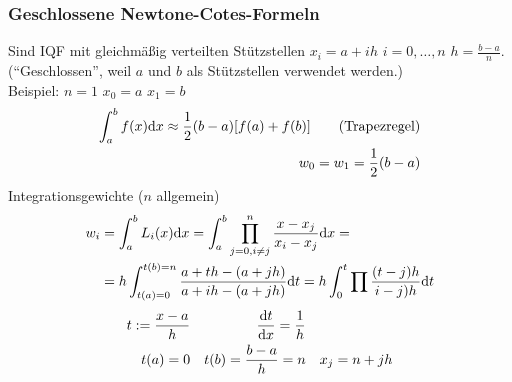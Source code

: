 \subsubsection{Geschlossene Newtone-Cotes-Formeln}
Sind IQF mit gleichmäßig verteilten Stützstellen $x_i = a + ih$ $i=0,\ldots,n$ $h=\frac{b-a}{n}$.
(``Geschlossen'', weil $a$ und $b$ als Stützstellen verwendet werden.)\\
Beispiel: $n=1$ $x_0=a$ $x_1=b$
\begin{align*}
  \int_a^b f(x) \mathrm{d}x \approx \frac{1}{2} (b-a)[f(a)+f(b)] \tag{Trapezregel}\\
  w_0 = w_1 = \frac{1}{2} (b-a)
\end{align*}
Integrationsgewichte ($n$ allgemein)
\begin{align*}
  w_i &= \int_a^b L_i(x) \mathrm{d}x = \int_a^b \prod_{j=0,i\neq j}^n \frac{x-x_j}{x_i - x_j}\mathrm{d}x =\\
  &= h \int_{t(a) = 0}^{t(b) = n} \frac{a + th - (a+jh)}{a + ih - (a+jh)} \mathrm{d}t = h \int_0^t \prod \frac{(t-j)h}{i-j)h} \mathrm{d}t
\end{align*}
\begin{align*}
  t:= \frac{x-a}{h} && \frac{\mathrm{d}t}{\mathrm{d}x} = \frac{1}{h} \\
  t(a)=0 && t(b)=\frac{b-a}{h}=n && x_j = n + jh
\end{align*}

